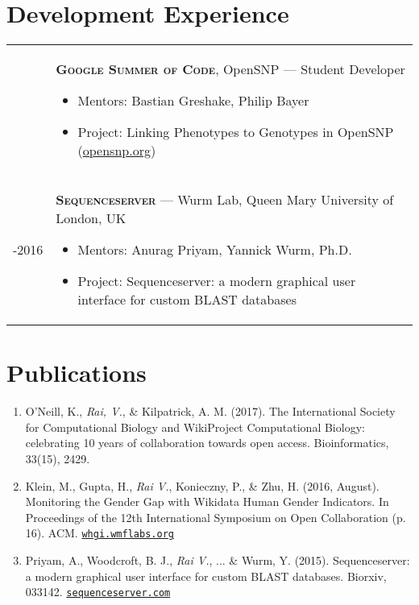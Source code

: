 \documentclass[11pt, letterpaper, oneside]{article}
\makeatletter
\newlength{\bibhang}
\newlength{\bibsep}
{\@listi \global\bibsep\itemsep \global\advance\bibsep by\parsep}
\newenvironment{bibsection}
{\begin{enumerate}{}{
  \setlength{\leftmargin}{\bibhang}%
    \setlength{\itemindent}{-\leftmargin}%
    \setlength{\itemsep}{\bibsep}%
    \setlength{\parsep}{\z@}%
    \setlength{\partopsep}{0pt}%
    \setlength{\topsep}{0pt}}}
{\end{enumerate}\vspace{-.6\baselineskip}}
\newcommand{\shorty}[1]{
  {\sectionfont\scshape\bfseries #1}}
\newenvironment{innerlist}[1][\enskip\textbullet]%
{\begin{itemize}[#1,leftmargin=0pt,parsep=0pt,itemsep=0pt,topsep=0pt,partopsep=0pt]}
{\end{itemize}}
\makeatother
\begin{document}
\vspace{-1em}
\section{Development Experience} {
\def\arraystretch{0}
\begin{tabularx}{\textwidth}{>{\hsize=0.15\hsize}XX}
2016 & \shorty{Google Summer of Code}, OpenSNP --- Student Developer
        \begin{innerlist}
		  \item[] Mentors: Bastian Greshake, Philip Bayer
          \item[] Project: Linking Phenotypes to Genotypes in OpenSNP (\url{opensnp.org})
        \end{innerlist} \\
2015-2016 & \shorty{Sequenceserver} --- Wurm Lab, Queen Mary University of London, UK
        \begin{innerlist}
		  \item[] Mentors: Anurag Priyam, Yannick Wurm, Ph.D.
          \item[] Project: Sequenceserver: a modern graphical user interface for custom BLAST databases
        \end{innerlist}
\end{tabularx}
}


\section{Publications}

\begin{bibsection}
	\item O’Neill, K., {\it Rai, V.}, & Kilpatrick, A. M. (2017). The International Society for Computational Biology and WikiProject Computational Biology: celebrating 10 years of collaboration towards open access. Bioinformatics, 33(15), 2429.

    \item Klein, M., Gupta, H., \emph{Rai V.}, Konieczny, P., & Zhu, H. (2016, August). Monitoring the Gender Gap with Wikidata Human Gender Indicators. In Proceedings of the 12th International Symposium on Open Collaboration (p. 16). ACM. \href{http://whgi.wmflabs.org}{\tt whgi.wmflabs.org}

    \item Priyam, A., Woodcroft, B. J., {\it Rai V.}, ... & Wurm, Y. (2015). Sequenceserver: a modern graphical user interface for custom BLAST databases. Biorxiv, 033142. \href{http://sequenceserver.com}{\tt sequenceserver.com}
\end{bibsection}
\end{document}

